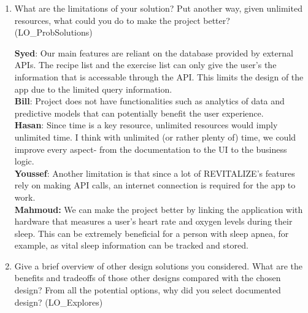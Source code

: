 \documentclass[12pt, titlepage]{article}
\begin{document}
	\begin{enumerate}
		\item What are the limitations of your solution?  Put another way, given
		unlimited resources, what could you do to make the project better? (LO\_ProbSolutions)
		
		\textbf{Syed}: Our main features are reliant on the database provided by external APIs. The recipe list and the exercise list can only give the user's the information that is accessable through the API. This limits the design of the app due to the limited query information. \\
		\textbf{Bill}: Project does not have functionalities such as analytics of data and predictive models that can potentially benefit the user experience. \\
		\textbf{Hasan}: Since time is a key resource, unlimited resources would imply unlimited time. I think with unlimited (or rather plenty of) time, we could improve every aspect- from the documentation to the UI to the business logic. \\
		\textbf{Youssef}: Another limitation is that since a lot of REVITALIZE's features rely on making API calls, an internet connection is required for the app to work. \\
		\textbf{Mahmoud:} We can make the project better by linking the application with hardware that measures a user's heart rate and oxygen levels during their sleep. This can be extremely beneficial for a person with sleep apnea, for example, as vital sleep information can be tracked and stored.

		
		
		\item Give a brief overview of other design solutions you considered.  What
		are the benefits and tradeoffs of those other designs compared with the chosen
		design?  From all the potential options, why did you select documented design?
		(LO\_Explores)
		

\end{enumerate}
\end{document}
